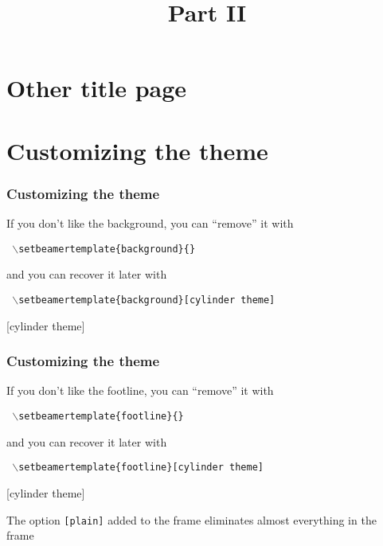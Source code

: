 \documentclass[12pt]{beamer}
\begin{document}


\section[Other title page]{Other title page}

\title{Part II}
\frame{\titlepage}

\section[Customization]{Customizing the theme}


\begin{frame}
\frametitle{Customizing the theme}

If you don't like the background, you can ``remove'' it with

\texttt{ $\backslash$setbeamertemplate\{background\}\{\} }

and you can recover it later with

\texttt{ $\backslash$setbeamertemplate\{background\}[cylinder theme] }

\end{frame}

[cylinder theme]

\begin{frame}
\frametitle{Customizing the theme}

If you don't like the footline, you can ``remove'' it with

\texttt{ $\backslash$setbeamertemplate\{footline\}\{\} }

and you can recover it later with

\texttt{ $\backslash$setbeamertemplate\{footline\}[cylinder theme] }

\end{frame}

[cylinder theme]

\begin{frame}[plain]

The option \texttt{[plain]} added to the frame
eliminates almost everything in the frame

\end{frame}
\end{document}
